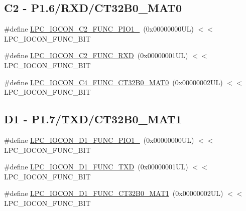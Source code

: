 \subsection*{C2 -\/ P1.6/\+R\+X\+D/\+C\+T32\+B0\+\_\+\+M\+A\+T0}
\begin{DoxyCompactItemize}
\item 
\#define \hyperlink{group___l_p_c___i_o_c_o_n___l_p_c1102___p_i_n_e_s_ga0f09acebc3f44b34a3b2a42a13888bd4}{L\+P\+C\+\_\+\+I\+O\+C\+O\+N\+\_\+\+C2\+\_\+\+F\+U\+N\+C\+\_\+\+P\+I\+O1\+\_}~(0x00000000\+U\+L) $<$$<$ L\+P\+C\+\_\+\+I\+O\+C\+O\+N\+\_\+\+F\+U\+N\+C\+\_\+\+B\+IT
\item 
\#define \hyperlink{group___l_p_c___i_o_c_o_n___l_p_c1102___p_i_n_e_s_ga2d578e6a171300d7662cbc772e561709}{L\+P\+C\+\_\+\+I\+O\+C\+O\+N\+\_\+\+C2\+\_\+\+F\+U\+N\+C\+\_\+\+R\+XD}~(0x00000001\+U\+L) $<$$<$ L\+P\+C\+\_\+\+I\+O\+C\+O\+N\+\_\+\+F\+U\+N\+C\+\_\+\+B\+IT
\item 
\#define \hyperlink{group___l_p_c___i_o_c_o_n___l_p_c1102___p_i_n_e_s_ga747cbcdca6a691c32f20216f8d25b0c1}{L\+P\+C\+\_\+\+I\+O\+C\+O\+N\+\_\+\+C4\+\_\+\+F\+U\+N\+C\+\_\+\+C\+T32\+B0\+\_\+\+M\+A\+T0}~(0x00000002\+U\+L) $<$$<$ L\+P\+C\+\_\+\+I\+O\+C\+O\+N\+\_\+\+F\+U\+N\+C\+\_\+\+B\+IT
\end{DoxyCompactItemize}
\subsection*{D1 -\/ P1.7/\+T\+X\+D/\+C\+T32\+B0\+\_\+\+M\+A\+T1}
\begin{DoxyCompactItemize}
\item 
\#define \hyperlink{group___l_p_c___i_o_c_o_n___l_p_c1102___p_i_n_e_s_gaffb3310b8c854e58d1f5e3c2449df182}{L\+P\+C\+\_\+\+I\+O\+C\+O\+N\+\_\+\+D1\+\_\+\+F\+U\+N\+C\+\_\+\+P\+I\+O1\+\_}~(0x00000000\+U\+L) $<$$<$ L\+P\+C\+\_\+\+I\+O\+C\+O\+N\+\_\+\+F\+U\+N\+C\+\_\+\+B\+IT
\item 
\#define \hyperlink{group___l_p_c___i_o_c_o_n___l_p_c1102___p_i_n_e_s_ga20f8d9546ce4f038a1546f542241ba86}{L\+P\+C\+\_\+\+I\+O\+C\+O\+N\+\_\+\+D1\+\_\+\+F\+U\+N\+C\+\_\+\+T\+XD}~(0x00000001\+U\+L) $<$$<$ L\+P\+C\+\_\+\+I\+O\+C\+O\+N\+\_\+\+F\+U\+N\+C\+\_\+\+B\+IT
\item 
\#define \hyperlink{group___l_p_c___i_o_c_o_n___l_p_c1102___p_i_n_e_s_ga3f3e6bd87d14b9164bf95b99abbd2461}{L\+P\+C\+\_\+\+I\+O\+C\+O\+N\+\_\+\+D1\+\_\+\+F\+U\+N\+C\+\_\+\+C\+T32\+B0\+\_\+\+M\+A\+T1}~(0x00000002\+U\+L) $<$$<$ L\+P\+C\+\_\+\+I\+O\+C\+O\+N\+\_\+\+F\+U\+N\+C\+\_\+\+B\+IT
\end{DoxyCompactItemize}



